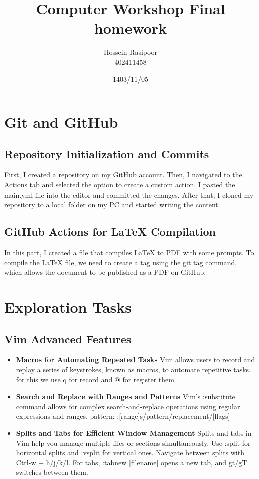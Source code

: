 \documentclass[titlepage]{article}
\title{ Computer Workshop Final homework}
\author{Hossein Rasipoor \\ 402411458}
\date{1403/11/05}
\begin{document}
\maketitle
\tableofcontents
\newpage

\section{Git and GitHub}
\subsection{Repository Initialization and Commits}
First, I created a repository on my GitHub account. Then, I navigated to the Actions tab and selected the option to create a custom action. I pasted the main.yml file into the editor and committed the changes. After that, I cloned my repository to a local folder on my PC and started writing the content.

\subsection{GitHub Actions for LaTeX Compilation}
In this part, I created a file that compiles LaTeX to PDF with some prompts. To compile the LaTeX file, we need to create a tag using the git tag command, which allows the document to be published as a PDF on GitHub.

\section{Exploration Tasks}
\subsection{Vim Advanced Features}
\begin{itemize}
    \item \textbf{Macros for Automating Repeated Tasks}
\newline
Vim allows users to record and replay a series of keystrokes, known as macros, to automate repetitive tasks. for this we use q for record and @ for register them
    \item \textbf{Search and Replace with Ranges and Patterns}
\newline
Vim's :substitute command allows for complex search-and-replace operations using regular expressions and ranges. pattern:
\newline
:[range]s/pattern/replacement/[flags]

    \item \textbf{Splits and Tabs for Efficient Window Management}
    \newline Splits and tabs in Vim help you manage multiple files or sections simultaneously. Use :split for horizontal splits and :vsplit for vertical ones. Navigate between splits with Ctrl-w + h/j/k/l. For tabs, :tabnew [filename] opens a new tab, and gt/gT switches between them.
\end{itemize}
\end{document}

